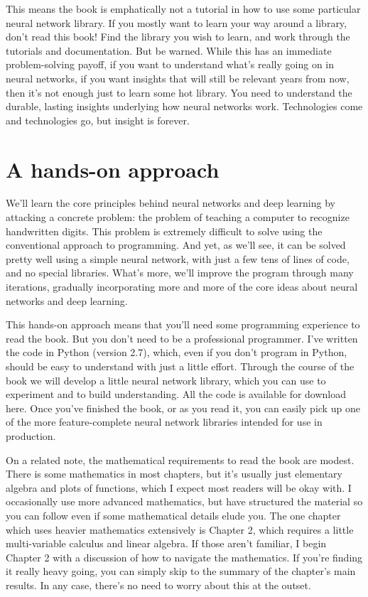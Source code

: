 \documentclass[a4paper,12pt]{report}%
\begin{document}
This means the book is emphatically not a tutorial in how to use some particular neural network library. If you mostly want to learn your way around a library, don't read this book! Find the library you wish to learn, and work through the tutorials and documentation. But be warned. While this has an immediate problem-solving payoff, if you want to understand what's really going on in neural networks, if you want insights that will still be relevant years from now, then it's not enough just to learn some hot library. You need to understand the durable, lasting insights underlying how neural networks work. Technologies come and technologies go, but insight is forever.

\section{A hands-on approach}
We'll learn the core principles behind neural networks and deep learning by attacking a concrete problem: the problem of teaching a computer to recognize handwritten digits. This problem is extremely difficult to solve using the conventional approach to programming. And yet, as we'll see, it can be solved pretty well using a simple neural network, with just a few tens of lines of code, and no special libraries. What's more, we'll improve the program through many iterations, gradually incorporating more and more of the core ideas about neural networks and deep learning.

This hands-on approach means that you'll need some programming experience to read the book. But you don't need to be a professional programmer. I've written the code in Python (version 2.7), which, even if you don't program in Python, should be easy to understand with just a little effort. Through the course of the book we will develop a little neural network library, which you can use to experiment and to build understanding. All the code is available for download here. Once you've finished the book, or as you read it, you can easily pick up one of the more feature-complete neural network libraries intended for use in production.

On a related note, the mathematical requirements to read the book are modest. There is some mathematics in most chapters, but it's usually just elementary algebra and plots of functions, which I expect most readers will be okay with. I occasionally use more advanced mathematics, but have structured the material so you can follow even if some mathematical details elude you. The one chapter which uses heavier mathematics extensively is Chapter 2, which requires a little multi-variable calculus and linear algebra. If those aren't familiar, I begin Chapter 2 with a discussion of how to navigate the mathematics. If you're finding it really heavy going, you can simply skip to the summary of the chapter's main results. In any case, there's no need to worry about this at the outset.
\end{document}
